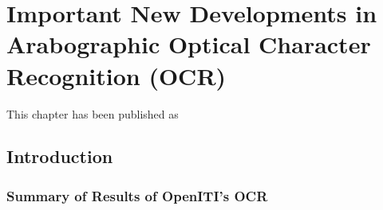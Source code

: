 ﻿\chapter{Important New Developments in Arabographic Optical Character Recognition (OCR)}
\nocite{soa0}
\nocite{soa1}
\nocite{soa2}
\nocite{soa3}
\nocite{soa4}
\nocite{soa5}
\nocite{soa6}
\thispagestyle{empty}
\vfill
This chapter has been published as 
\newpage

\section{Introduction}

\subsection{Summary of Results of OpenITI’s OCR}

